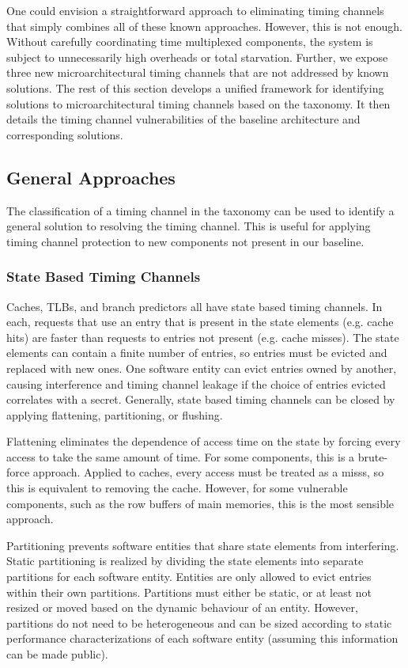 One could envision a straightforward approach to eliminating timing channels 
that simply combines all of these known approaches. However, this is not 
enough. Without carefully coordinating time multiplexed components, the system 
is subject to unnecessarily high overheads or total starvation.  Further, we 
expose three new microarchitectural timing channels that are not addressed by 
known solutions. The rest of this section develops a unified framework for 
identifying solutions to microarchitectural timing channels based on the 
taxonomy. It then details the timing channel vulnerabilities of the baseline 
architecture and corresponding solutions.

\subsection{General Approaches}
The classification of a timing channel in the taxonomy can be used to identify 
a general solution to resolving the timing channel. This is useful for applying 
timing channel protection to new components not present in our baseline.  
\subsubsection{State Based Timing Channels}
Caches, TLBs, and branch predictors all have state based timing channels. In 
each, requests that use an entry that is present in the state elements (e.g.  
cache hits) are faster than requests to entries not present (e.g. cache 
misses). The state elements can contain a finite number of entries, so entries 
must be evicted and replaced with new ones. One software entity can evict 
entries owned by another, causing interference and timing channel leakage if 
the choice of entries evicted correlates with a secret. Generally, state based 
timing channels can be closed by applying flattening, partitioning, or 
flushing.

Flattening eliminates the dependence of access time on the state by forcing 
every access to take the same amount of time. For some components, this is a 
brute-force approach. Applied to caches, every access must be treated as a 
misss, so this is equivalent to removing the cache. However, for some 
vulnerable components, such as the row buffers of main memories, this is the 
most sensible approach.

Partitioning prevents software entities that share state elements from 
interfering. Static partitioning is realized by dividing the state elements 
into separate partitions for each software entity. Entities are only allowed to 
evict entries within their own partitions. Partitions must either be static, or 
at least not resized or moved based on the dynamic behaviour of an entity.
However, partitions do not need to be heterogeneous and can be sized according 
to static performance characterizations of each software entity (assuming this 
information can be made public).

